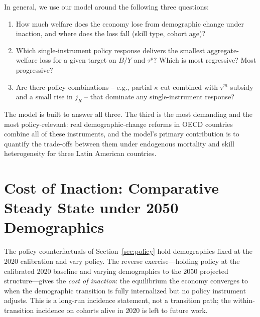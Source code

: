 \documentclass[12pt,a4paper]{article}
\begin{document}
\par In general, we use our model around the following three questions:
\begin{enumerate}
\item How much welfare does the economy lose from demographic change under inaction, and where does the loss fall (skill type, cohort age)?
\item Which single-instrument policy response delivers the smallest aggregate-welfare loss for a given target on $B/Y$ and $\tau^p$? Which is most regressive? Most progressive?
\item Are there policy combinations -- e.g., partial $\kappa$ cut combined with $\tau^m$ subsidy and a small rise in $j_R$ -- that dominate any single-instrument response?
\end{enumerate}
The model is built to answer all three. The third is the most demanding and the most policy-relevant: real demographic-change reforms in OECD countries combine all of these instruments, and the model's primary contribution is to quantify the trade-offs between them under endogenous mortality and skill heterogeneity for three Latin American countries.


\section{Cost of Inaction: Comparative Steady State under 2050 Demographics}
\label{sec:aging}

The policy counterfactuals of Section~\ref{sec:policy} hold demographics fixed at the 2020 calibration and vary policy. The reverse exercise---holding policy at the calibrated 2020 baseline and varying demographics to the 2050 projected structure---gives the \emph{cost of inaction}: the equilibrium the economy converges to when the demographic transition is fully internalized but no policy instrument adjusts. This is a long-run incidence statement, not a transition path; the within-transition incidence on cohorts alive in 2020 is left to future work.
\end{document}

